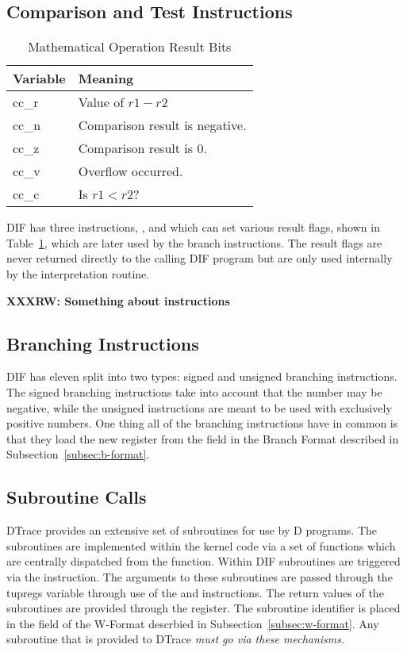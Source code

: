 \subsection{Comparison and Test Instructions}
\label{sec:dif-cmp-tst}

\begin{table}
  \centering
    \begin{tabular}{|l|l|}
      \hline
      Variable & Meaning\\
      \hline
      cc\_r & Value of $r1 - r2$\\
      cc\_n & Comparison result is negative. \\
      cc\_z & Comparison result is 0.\\
      cc\_v & Overflow occurred.\\
      cc\_c & Is $r1 < r2$?\\
      \hline
  \end{tabular}
\label{tbl:cmp-vars}
\caption{Mathematical Operation Result Bits}
\end{table}

DIF has three instructions, ,  and
 which can set various result flags, shown in
Table~\ref{tbl:cmp-vars}, which are later used by the branch
instructions.  The result flags are never returned directly to the
calling DIF program but are only used internally by the interpretation
routine.

\textbf{XXXRW: Something about instructions}

\subsection{Branching Instructions}

DIF has eleven split into two types: signed and unsigned branching instructions.
The signed branching instructions take into account that the number may be
negative, while the unsigned instructions are meant to be used with exclusively
positive numbers. One thing all of the branching instructions have in common is
that they load the new  register from the  field
in the Branch Format described in Subsection~\ref{subsec:b-format}.

\subsection{Subroutine Calls}
\label{sec:subroutines}

DTrace provides an extensive set of subroutines for use by D programs.  The
subroutines are implemented within the kernel code via a set of functions which
are centrally dispatched from the  function.  Within
DIF subroutines are triggered via the  instruction. The
arguments to these subroutines are passed through the tupregs variable through
use of the  and  instructions. The
return values of the subroutines are provided through the 
register. The subroutine identifier is placed in the  field of
the W-Format descrbied in Subsection~\ref{subsec:w-format}. Any subroutine that
is provided to DTrace \em{must} go via these mechanisms.

